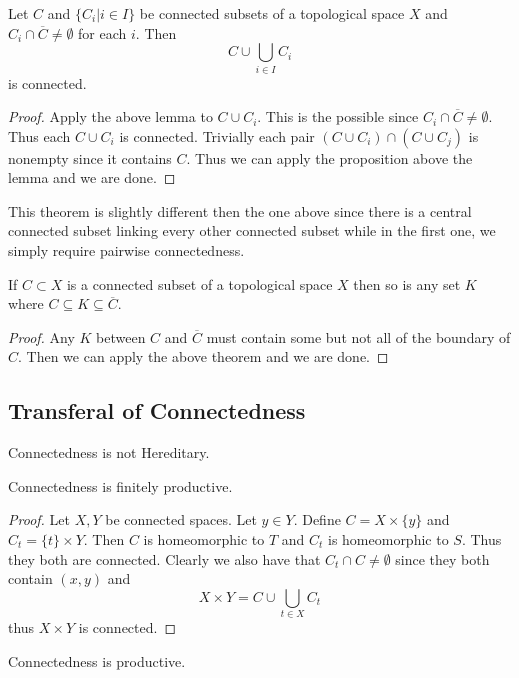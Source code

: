 \documentclass[a4paper]{article}
\begin{document}
\begin{thm}{}{} Let $C$ and $\{C_i|i\in I\}$ be connected subsets of a topological space $X$ and $C_i\cap\overline{C}\neq\emptyset$ for each $i$. Then $$C\cup\bigcup_{i\in I}C_i$$ is connected. 
\begin{proof}
Apply the above lemma to $C\cup C_i$. This is the possible since $C_i\cap\overline{C}\neq\emptyset$. Thus each $C\cup C_i$ is connected. Trivially each pair $(C\cup C_i)\cap(C\cup C_j)$ is nonempty since it contains $C$. Thus we can apply the proposition above the lemma and we are done. 
\end{proof}
\end{thm}

This theorem is slightly different then the one above since there is a central connected subset linking every other connected subset while in the first one, we simply require pairwise connectedness. 

\begin{crl}{}{} If $C\subset X$ is a connected subset of a topological space $X$ then so is any set $K$ where $C\subseteq K\subseteq\overline{C}$. 
\begin{proof}
Any $K$ between $C$ and $\overline{C}$ must contain some but not all of the boundary of $C$. Then we can apply the above theorem and we are done. 
\end{proof}
\end{crl}

\subsection{Transferal of Connectedness}
\begin{prp}{}{} Connectedness is not Hereditary. 
\end{prp}

\begin{prp}{}{} Connectedness is finitely productive. 
\begin{proof}
Let $X,Y$ be connected spaces. Let $y\in Y$. Define $C=X\times\{y\}$ and $C_t=\{t\}\times Y$. Then $C$ is homeomorphic to $T$ and $C_t$ is homeomorphic to $S$. Thus they both are connected. Clearly we also have that $C_t\cap C\neq\emptyset$ since they both contain $(x,y)$ and $$X\times Y=C\cup\bigcup_{t\in X}C_t$$ thus $X\times Y$ is connected. 
\end{proof}
\end{prp}

\begin{prp}{}{} Connectedness is productive. 
\end{prp}
\end{document}
